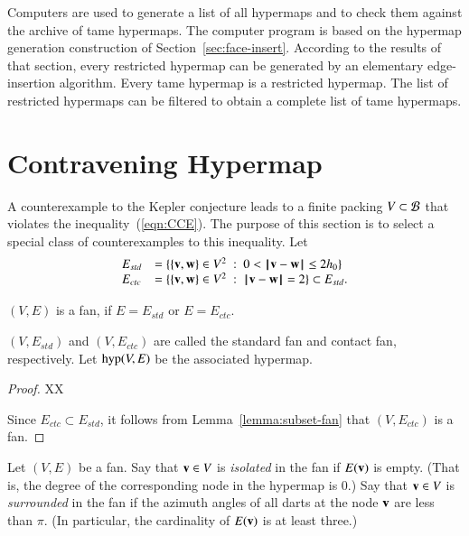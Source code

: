 Computers are used to generate a list of all hypermaps and to check
them against the archive of tame hypermaps.  The computer program is
based on the hypermap generation construction of Section~\ref{sec:face-insert}.  According
to the results of that section, every restricted hypermap can be generated by an
elementary edge-insertion algorithm.  Every tame hypermap is a restricted hypermap.
The list of restricted hypermaps can be filtered to obtain a complete list of tame hypermaps.
%

\section{Contravening Hypermap}

%
A counterexample to the Kepler conjecture leads to a finite packing $V\subset {\mathcal B}$ that violates the inequality~(\ref{eqn:CCE}).
 The purpose of this section is to select a special class of counterexamples to this inequality.
Let
\begin{equation}\label{eqn:fan-edge}
\begin{array}{lll}
 E_{std} &= \{\{{\mathbf v},{\mathbf w}\}\in V^2\ :\  0 < {\hskip0.1em|\hskip-0.15em|\hskip0.1em}{\mathbf v} - {\mathbf w}{\hskip0.1em|\hskip-0.15em|\hskip0.1em}\le 2{h_0} \}\\
 E_{ctc} &= \{\{{\mathbf v},{\mathbf w}\}\in V^2\ :\  {\hskip0.1em|\hskip-0.15em|\hskip0.1em}{\mathbf v} - {\mathbf w}{\hskip0.1em|\hskip-0.15em|\hskip0.1em}= 2 \}\subset E_{std}.
\end{array}
\end{equation}

\begin{lemma}
$(V,E)$ is a fan, if $E=E_{std}$ or $E=E_{ctc}$.
\end{lemma}
$(V,E_{std})$ and $(V,E_{ctc})$ are called the standard fan and contact fan, respectively.
Let ${\operatorname{hyp}}(V,E)$ be the associated hypermap.
%
%
%
%
%
%
%

\begin{proof} 
XX

Since $E_{ctc}\subset E_{std}$, it follows from Lemma~\ref{lemma:subset-fan} that
$(V,E_{ctc})$ is a fan.
\end{proof}

\begin{definition}
Let $(V,E)$ be a fan.
Say that ${\mathbf v}\in V$ is {\it isolated} in the fan if $E({\mathbf v})$ is empty.
(That is, the degree of the corresponding node in the hypermap is $0$.) Say that ${\mathbf v}\in V$ is {\it surrounded} in the fan if the azimuth angles of all darts at the node ${\mathbf v}$ are less than $\pi$.  (In particular, the cardinality of $E({\mathbf v})$ is at least three.)
\end{definition}
%
%
%
%
%
%

